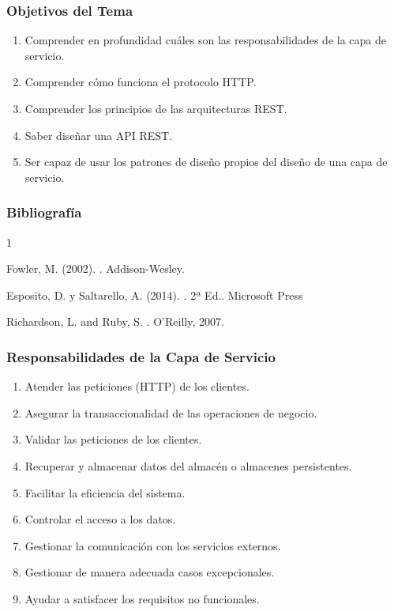 \documentclass[a4paper,slidestop,blue]{beamer}
\begin{document}
\begin{frame}[c]
    \frametitle{Objetivos del Tema}
    \begin{enumerate}[<+->]
         \item Comprender en profundidad cuáles son las responsabilidades de la capa de servicio.
         \item Comprender cómo funciona el protocolo HTTP.
         \item Comprender los principios de las arquitecturas REST.
         \item Saber diseñar una API REST.
         \item Ser capaz de usar los patrones de diseño propios del diseño de una capa de servicio.
    \end{enumerate}
\end{frame}

\begin{frame}[c]
    \frametitle{Bibliografía}
    \begin{thebibliography}{1}

        Fowler, M. (2002).
        .
        \newblock Addison-Wesley.

        Esposito, D. y Saltarello, A. (2014).
        . 2ª Ed..
        \newblock Microsoft Press

        Richardson, L. and Ruby, S.
        .
        \newblock  O'Reilly, 2007.

    \end{thebibliography}
\end{frame}

\begin{frame}[c]
	\frametitle{Responsabilidades de la Capa de Servicio}
	\begin{enumerate}[<+->]
        \item Atender las peticiones (HTTP) de los clientes.
        \item Asegurar la transaccionalidad de las operaciones de negocio.
        \item Validar las peticiones de los clientes.
        \item Recuperar y almacenar datos del almacén o almacenes persistentes.
        \item Facilitar la eficiencia del sistema.
        \item Controlar el acceso a los datos.
        \item Gestionar la comunicación con los servicios externos.
        \item Gestionar de manera adecuada casos excepcionales.
        \item Ayudar a satisfacer los requisitos no funcionales.
	\end{enumerate}
\end{frame}
\end{document}
